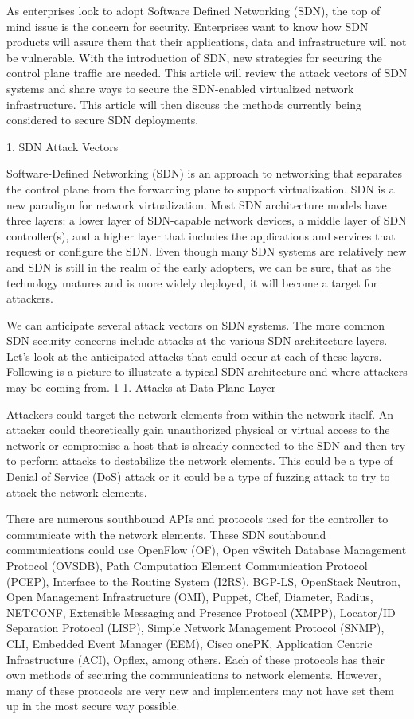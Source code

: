 As enterprises look to adopt Software Defined Networking (SDN), the top of mind issue is the concern for security. Enterprises want to know how SDN products will assure them that their applications, data and infrastructure will not be vulnerable. With the introduction of SDN, new strategies for securing the control plane traffic are needed. This article will review the attack vectors of SDN systems and share ways to secure the SDN-enabled virtualized network infrastructure. This article will then discuss the methods currently being considered to secure SDN deployments.

1. SDN Attack Vectors

Software-Defined Networking (SDN) is an approach to networking that separates the control plane from the forwarding plane to support virtualization.  SDN is a new paradigm for network virtualization.  Most SDN architecture models have three layers: a lower layer of SDN-capable network devices, a middle layer of SDN controller(s), and a higher layer that includes the applications and services that request or configure the SDN.  Even though many SDN systems are relatively new and SDN is still in the realm of the early adopters, we can be sure, that as the technology matures and is more widely deployed, it will become a target for attackers.

We can anticipate several attack vectors on SDN systems.  The more common SDN security concerns include attacks at the various SDN architecture layers.  Let’s look at the anticipated attacks that could occur at each of these layers.  Following is a picture to illustrate a typical SDN architecture and where attackers may be coming from.
1-1. Attacks at Data Plane Layer

Attackers could target the network elements from within the network itself.  An attacker could theoretically gain unauthorized physical or virtual access to the network or compromise a host that is already connected to the SDN and then try to perform attacks to destabilize the network elements.  This could be a type of Denial of Service (DoS) attack or it could be a type of fuzzing attack to try to attack the network elements.

There are numerous southbound APIs and protocols used for the controller to communicate with the network elements.  These SDN southbound communications could use OpenFlow (OF), Open vSwitch Database Management Protocol (OVSDB), Path Computation Element Communication Protocol (PCEP), Interface to the Routing System (I2RS), BGP-LS, OpenStack Neutron, Open Management Infrastructure (OMI), Puppet, Chef, Diameter, Radius, NETCONF, Extensible Messaging and Presence Protocol (XMPP), Locator/ID Separation Protocol (LISP), Simple Network Management Protocol (SNMP), CLI, Embedded Event Manager (EEM), Cisco onePK, Application Centric Infrastructure (ACI), Opflex, among others.  Each of these protocols has their own methods of securing the communications to network elements.  However, many of these protocols are very new and implementers may not have set them up in the most secure way possible.

